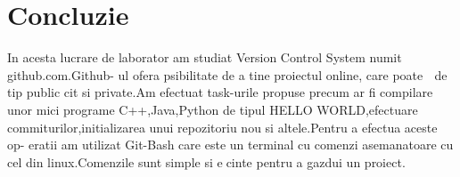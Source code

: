 \section*{Concluzie}
In acesta lucrare de laborator am studiat Version Control System numit github.com.Github-
ul ofera psibilitate de a tine proiectul online, care poate  de tip public cit si private.Am efectuat
task-urile propuse precum ar fi compilare unor mici programe C++,Java,Python de tipul HELLO
WORLD,efectuare commiturilor,initializarea unui repozitoriu nou si altele.Pentru a efectua aceste op-
eratii am utilizat Git-Bash care este un terminal cu comenzi asemanatoare cu cel din linux.Comenzile
sunt simple si ecinte pentru a gazdui un proiect.
\clearpage